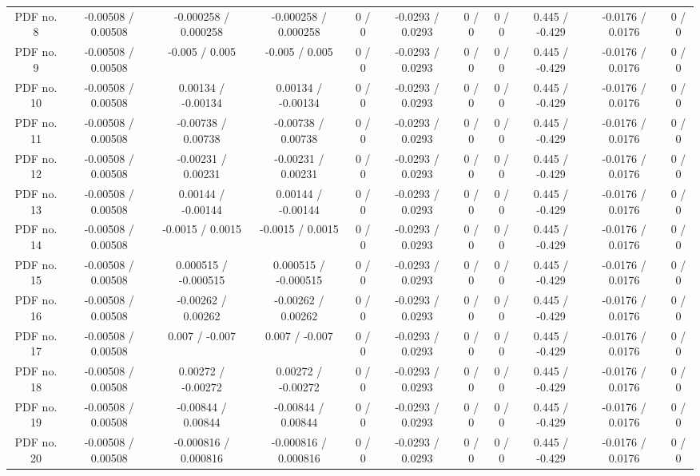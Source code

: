 \begin{table}[htbp]
\begin{center}
\begin{tabular}{|c|c|c|c|c|c|c|c|c|c|c|}
  PDF no. 8 & -0.00508 / 0.00508 & -0.000258 / 0.000258 & -0.000258 / 0.000258 & 0 / 0 & -0.0293 / 0.0293 & 0 / 0 & 0 / 0 & 0.445 / -0.429 & -0.0176 / 0.0176 & 0 / 0 \\ 
  PDF no. 9 & -0.00508 / 0.00508 & -0.005 / 0.005 & -0.005 / 0.005 & 0 / 0 & -0.0293 / 0.0293 & 0 / 0 & 0 / 0 & 0.445 / -0.429 & -0.0176 / 0.0176 & 0 / 0 \\ 
  PDF no. 10 & -0.00508 / 0.00508 & 0.00134 / -0.00134 & 0.00134 / -0.00134 & 0 / 0 & -0.0293 / 0.0293 & 0 / 0 & 0 / 0 & 0.445 / -0.429 & -0.0176 / 0.0176 & 0 / 0 \\ 
  PDF no. 11 & -0.00508 / 0.00508 & -0.00738 / 0.00738 & -0.00738 / 0.00738 & 0 / 0 & -0.0293 / 0.0293 & 0 / 0 & 0 / 0 & 0.445 / -0.429 & -0.0176 / 0.0176 & 0 / 0 \\ 
  PDF no. 12 & -0.00508 / 0.00508 & -0.00231 / 0.00231 & -0.00231 / 0.00231 & 0 / 0 & -0.0293 / 0.0293 & 0 / 0 & 0 / 0 & 0.445 / -0.429 & -0.0176 / 0.0176 & 0 / 0 \\ 
  PDF no. 13 & -0.00508 / 0.00508 & 0.00144 / -0.00144 & 0.00144 / -0.00144 & 0 / 0 & -0.0293 / 0.0293 & 0 / 0 & 0 / 0 & 0.445 / -0.429 & -0.0176 / 0.0176 & 0 / 0 \\ 
  PDF no. 14 & -0.00508 / 0.00508 & -0.0015 / 0.0015 & -0.0015 / 0.0015 & 0 / 0 & -0.0293 / 0.0293 & 0 / 0 & 0 / 0 & 0.445 / -0.429 & -0.0176 / 0.0176 & 0 / 0 \\ 
  PDF no. 15 & -0.00508 / 0.00508 & 0.000515 / -0.000515 & 0.000515 / -0.000515 & 0 / 0 & -0.0293 / 0.0293 & 0 / 0 & 0 / 0 & 0.445 / -0.429 & -0.0176 / 0.0176 & 0 / 0 \\ 
  PDF no. 16 & -0.00508 / 0.00508 & -0.00262 / 0.00262 & -0.00262 / 0.00262 & 0 / 0 & -0.0293 / 0.0293 & 0 / 0 & 0 / 0 & 0.445 / -0.429 & -0.0176 / 0.0176 & 0 / 0 \\ 
  PDF no. 17 & -0.00508 / 0.00508 & 0.007 / -0.007 & 0.007 / -0.007 & 0 / 0 & -0.0293 / 0.0293 & 0 / 0 & 0 / 0 & 0.445 / -0.429 & -0.0176 / 0.0176 & 0 / 0 \\ 
  PDF no. 18 & -0.00508 / 0.00508 & 0.00272 / -0.00272 & 0.00272 / -0.00272 & 0 / 0 & -0.0293 / 0.0293 & 0 / 0 & 0 / 0 & 0.445 / -0.429 & -0.0176 / 0.0176 & 0 / 0 \\ 
  PDF no. 19 & -0.00508 / 0.00508 & -0.00844 / 0.00844 & -0.00844 / 0.00844 & 0 / 0 & -0.0293 / 0.0293 & 0 / 0 & 0 / 0 & 0.445 / -0.429 & -0.0176 / 0.0176 & 0 / 0 \\ 
  PDF no. 20 & -0.00508 / 0.00508 & -0.000816 / 0.000816 & -0.000816 / 0.000816 & 0 / 0 & -0.0293 / 0.0293 & 0 / 0 & 0 / 0 & 0.445 / -0.429 & -0.0176 / 0.0176 & 0 / 0 \\ 

\end{tabular}
\end{center}
\end{table}
